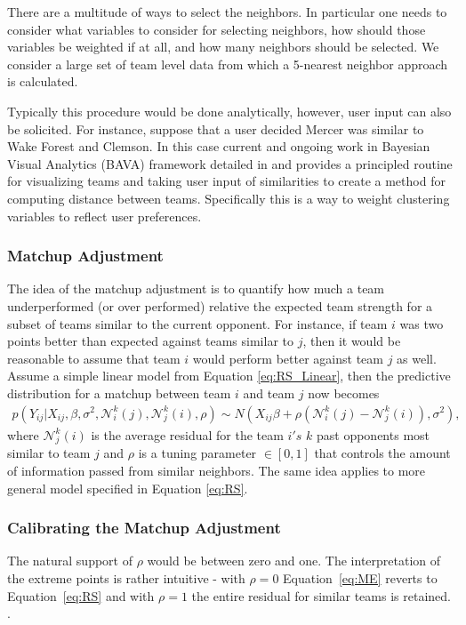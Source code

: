 There are a multitude of ways to select the neighbors. In particular one needs to consider what variables to consider for selecting neighbors, how should those variables be weighted if at all, and how many neighbors should be selected. We consider a large set of team level data from which a 5-nearest neighbor approach is calculated. 

Typically this procedure would be done analytically, however, user input can also be solicited. For instance, suppose that a user decided Mercer was similar to Wake Forest and Clemson. In this case current and ongoing work in Bayesian Visual Analytics (BAVA) framework detailed in \cite{house2010}  and  provides a principled routine for visualizing teams and taking user input of similarities to create a method for computing distance between teams. Specifically this is a way to weight clustering variables to reflect user preferences.
\subsubsection{Matchup Adjustment}
The idea of the matchup adjustment is to quantify how much a team underperformed (or over performed) relative the expected team strength for a subset of teams similar to the current opponent. For instance, if team $i$ was two points better than expected against teams similar to $j$, then it would be reasonable to assume that team $i$ would perform better against team $j$ as well.  Assume a simple linear model from Equation \ref{eq:RS_Linear}, then the predictive distribution for a matchup between team $i$ and team $j$ now becomes 
\begin{eqnarray}
p(Y_{ij}|X_{ij}, \beta,\sigma^2,\mathcal{N}_i^k(j),\mathcal{N}_j^k(i), \rho) \sim N(X_{ij} \beta + \rho(\mathcal{N}_i^k(j) -\mathcal{N}_j^k(i)), \sigma^2),
\label{eq:ME}
\end{eqnarray}
where $\mathcal{N}_j^k(i)$ is the average residual for the team $i's$ $k$ past opponents most similar to team $j$ and $\rho$ is a tuning parameter $\in [0,1]$ that controls the amount of information passed from similar neighbors. The same idea applies to more general model specified in Equation \ref{eq:RS}.

\subsubsection{Calibrating the Matchup Adjustment}
The natural support of $\rho$ would be between zero and one.  The interpretation of the extreme points is rather intuitive - with $\rho = 0$ Equation~\ref{eq:ME} reverts to Equation~\ref{eq:RS} and with $\rho = 1$ the entire residual for similar teams is retained. .

